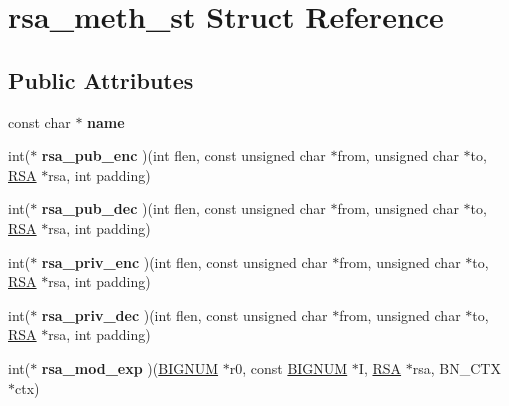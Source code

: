 \hypertarget{structrsa__meth__st}{}\section{rsa\+\_\+meth\+\_\+st Struct Reference}
\label{structrsa__meth__st}
\subsection*{Public Attributes}
\begin{DoxyCompactItemize}
\item 
\mbox{\label{structrsa__meth__st_a7ce6d4139c1e9e8b220d2d3b3f240a14}} 
const char $\ast$ {\bfseries name}
\item 
\mbox{\label{structrsa__meth__st_a6ff51f7f2fd9b5b7e16a30616301caa7}} 
int($\ast$ {\bfseries rsa\+\_\+pub\+\_\+enc} )(int flen, const unsigned char $\ast$from, unsigned char $\ast$to, \hyperlink{structrsa__st}{R\+SA} $\ast$rsa, int padding)
\item 
\mbox{\label{structrsa__meth__st_a4eb63fb1e1abbe10f8cd81c1efef8cf4}} 
int($\ast$ {\bfseries rsa\+\_\+pub\+\_\+dec} )(int flen, const unsigned char $\ast$from, unsigned char $\ast$to, \hyperlink{structrsa__st}{R\+SA} $\ast$rsa, int padding)
\item 
\mbox{\label{structrsa__meth__st_abb623f4c63d15a39af63ec2ead7cf803}} 
int($\ast$ {\bfseries rsa\+\_\+priv\+\_\+enc} )(int flen, const unsigned char $\ast$from, unsigned char $\ast$to, \hyperlink{structrsa__st}{R\+SA} $\ast$rsa, int padding)
\item 
\mbox{\label{structrsa__meth__st_a0a9fcf9d1e4799ab69233c2187921fe1}} 
int($\ast$ {\bfseries rsa\+\_\+priv\+\_\+dec} )(int flen, const unsigned char $\ast$from, unsigned char $\ast$to, \hyperlink{structrsa__st}{R\+SA} $\ast$rsa, int padding)
\item 
\mbox{\label{structrsa__meth__st_a055a4194b3a73d653111656553b2ae8c}} 
int($\ast$ {\bfseries rsa\+\_\+mod\+\_\+exp} )(\hyperlink{structbignum__st}{B\+I\+G\+N\+UM} $\ast$r0, const \hyperlink{structbignum__st}{B\+I\+G\+N\+UM} $\ast$I, \hyperlink{structrsa__st}{R\+SA} $\ast$rsa, B\+N\+\_\+\+C\+TX $\ast$ctx)

\end{DoxyCompactItemize}

